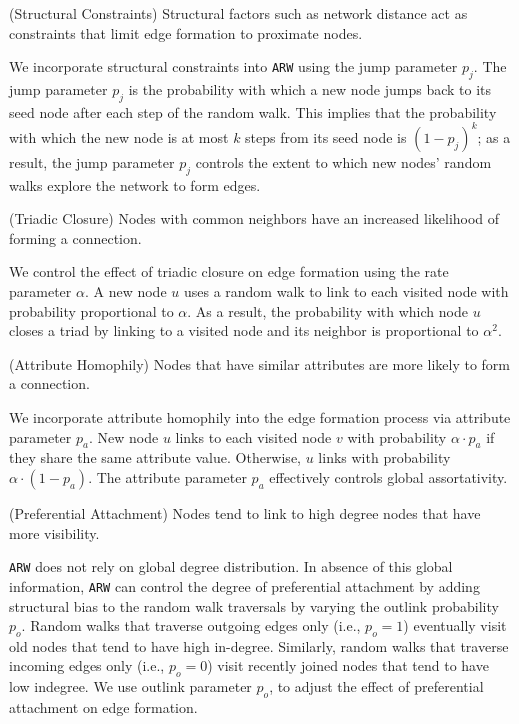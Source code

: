 \begin{ph}
	(Structural Constraints) Structural factors such as network distance
	act as constraints that limit edge formation to proximate nodes.  \cite{35626}
\end{ph}

We incorporate structural constraints into \texttt{ARW} using the jump parameter $p_j$.
The jump parameter $p_j$ is the probability with which a new node jumps back to its seed node
after each step of the random walk. This implies that the probability with which the new node
is at most $k$ steps from its seed node is $(1-p_j)^k$; as a result, the jump parameter $p_j$
controls the extent to which new nodes' random walks explore the network to form edges.

\begin{ph}
	(Triadic Closure) Nodes with common neighbors have an
	increased likelihood of forming a connection. \cite{simmel1950sociology}
\end{ph}

We control the effect of triadic closure on edge formation using the
rate parameter $\alpha$. A new node $u$ uses a random walk to
link to each visited node with probability proportional to $\alpha$. As a
result, the probability with which node $u$ closes a triad by linking to
a visited node and its neighbor is proportional to $\alpha^2$.

\begin{ph}
	(Attribute Homophily) Nodes that have similar attributes are more likely
	to form a connection. \cite{mcpherson2001birds}
\end{ph}
We incorporate attribute homophily into the edge formation process via attribute parameter $p_a$. New node
$u$ links to each visited node $v$ with probability $\alpha \cdot p_a$ if they share
the same attribute value. Otherwise, $u$ links with probability $\alpha \cdot (1-p_a)$.
The attribute parameter $p_a$ effectively controls global assortativity.

\begin{ph}
	(Preferential Attachment) Nodes tend to link to high degree nodes that have more
	visibility. \cite{barabasi1999emergence}
\end{ph}
\texttt{ARW} does not rely on global degree distribution. In absence of this
global information, \texttt{ARW} can control the degree of preferential
attachment by adding structural bias to the random walk traversals by varying
the outlink probability $p_o$. Random walks that traverse outgoing edges only
(i.e., $p_o =1$) eventually visit old nodes that tend to have high in-degree.
Similarly, random walks that traverse incoming edges only (i.e., $p_o=0$) visit
recently joined nodes that tend to have low indegree. We use outlink parameter
$p_o$, to adjust the effect of preferential attachment on edge formation.

